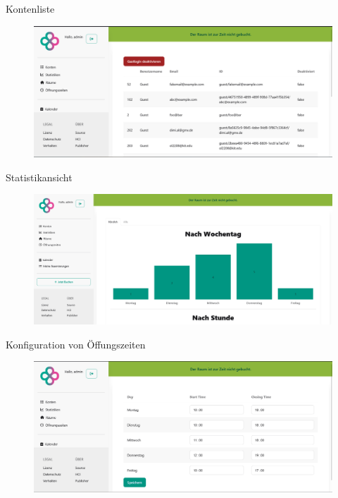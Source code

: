 \begin{frame}{Kontenliste}
    \thispagestyle{plain}
    \begin{figure}
        \centering
        \includegraphics[width=1\linewidth]{pictures/admin_users.png}
        \label{fig:enter-label}
    \end{figure}
    
\end{frame}

\begin{frame}{Statistikansicht}
    \thispagestyle{plain}
    \begin{figure}
        \centering
        \includegraphics[width=1\linewidth]{pictures/admin_statistics.png}
        \label{fig:enter-label}
    \end{figure}
\end{frame}

\begin{frame}{Konfiguration von Öffungszeiten}
    \thispagestyle{plain}
    \begin{figure}
        \centering
        \includegraphics[width=1\linewidth]{pictures/admin_opening_hours.png}
        \label{fig:enter-label}
    \end{figure}
\end{frame}

